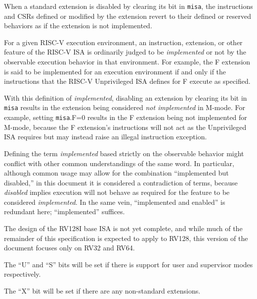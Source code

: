 When a standard extension is disabled by clearing its bit in {\tt misa}, the instructions and CSRs defined or modified by the extension revert to their defined or reserved behaviors as if the extension is not implemented.

\begin{commentary}
For a given \mbox{RISC-V} execution environment, an instruction,
extension, or other feature of the \mbox{RISC-V} ISA
is ordinarily judged to be \emph{implemented} or not
by the observable execution behavior in that environment.
For example, the F extension is said to be implemented for
an execution environment if and only if the instructions that the
\mbox{RISC-V} Unprivileged ISA defines for F execute as specified.

With this definition of \emph{implemented}, disabling an
extension by clearing its bit in {\tt misa} results in the
extension being considered \emph{not implemented} in M-mode.
For example, setting {\tt misa}.F=0 results in the F extension
being not implemented for M-mode, because the F extension's
instructions will not act as the Unprivileged ISA requires
but may instead raise an illegal instruction exception.

Defining the term \emph{implemented}
based strictly on the observable behavior might conflict
with other common understandings of the same word.
In particular, although common usage may allow
for the combination ``implemented but disabled,''
in this document it is considered a contradiction of terms,
because \emph{disabled} implies execution will not behave
as required for the feature to be considered \emph{implemented}.
In the same vein, ``implemented and enabled'' is redundant here;
``implemented'' suffices.
\end{commentary}

The design of the RV128I base ISA is not yet complete, and while much of the remainder of this
specification is expected to apply to RV128, this version of the document
focuses only on RV32 and RV64.

The ``U'' and ``S'' bits will be set if there is support for user and
supervisor modes respectively.

The ``X'' bit will be set if there are any non-standard extensions.

